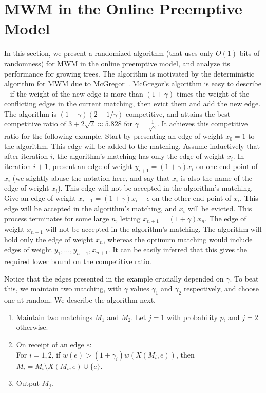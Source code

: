 \documentclass[11pt]{article}
\begin{document}
\section{MWM in the Online Preemptive Model}\label{algo}
In this section, we present a randomized algorithm (that uses only $O(1)$ bits of randomness) for MWM in the online preemptive model, and analyze its performance for growing trees. The algorithm is motivated by the deterministic algorithm for MWM due to McGregor~\cite{mcgregor}. McGregor's algorithm is easy to describe -- if the weight of the new edge is more than $(1+\gamma)$ times the weight of the conflicting edges in the current matching, then evict them and add the new edge. The algorithm is $(1+\gamma)(2+1/\gamma)$-competitive, and attains the best competitive ratio of $3+2\sqrt{2} \approx 5.828$ for $\gamma=\frac{1}{\sqrt{2}}$. It achieves this competitive ratio for the following example. Start by presenting an edge of weight $x_0=1$ to the algorithm. This edge will be added to the matching. Assume inductively that after iteration $i$, the algorithm's matching has only the edge of weight $x_i$. In iteration $i+1$, present an edge of weight $y_{i+1}=(1+\gamma)x_i$ on one end point of $x_i$ (we slightly abuse the notation here, and say that $x_i$ is also the name of the edge of weight $x_i$). This edge will not be accepted in the algorithm's matching. Give an edge of weight $x_{i+1}=(1+\gamma)x_i + \epsilon$ on the other end point of $x_i$. This edge will be accepted in the algorithm's matching, and $x_i$ will be evicted. This process terminates for some large $n$, letting $x_{n+1}=(1+\gamma)x_n$. The edge of weight $x_{n+1}$ will not be accepted in the algorithm's matching. The algorithm will hold only the edge of weight $x_n$, whereas the optimum matching would include edges of weight $y_1,\dots,y_{n+1},x_{n+1}$. It can be easily inferred that this gives the required lower bound on the competitive ratio.
  
Notice that the edges presented in the example crucially depended on $\gamma$. To beat this, we maintain two matching, with $\gamma$ values $\gamma_1$ and $\gamma_2$ respectively, and choose one at random. We describe the algorithm next.
  
 \begin{algorithm}[H]
  \caption{Randomized Algorithm for MWM}\label{algo_mwm}
  \label{MWM_rand_algo}
  \begin{enumerate}
   \item Maintain two matchings $M_1$ and $M_2$. Let $j=1$ with probability $p$, and $j=2$ otherwise.
   \item On receipt of an edge $e$:\\
	  For $i=1,2$, if $w(e)>(1+\gamma_i)w(X(M_i,e))$, then $M_i=M_i\setminus X(M_i,e) \cup \{e\}$.
   \item Output $M_j$.
  \end{enumerate}

 \end{algorithm}
 
\end{document}
